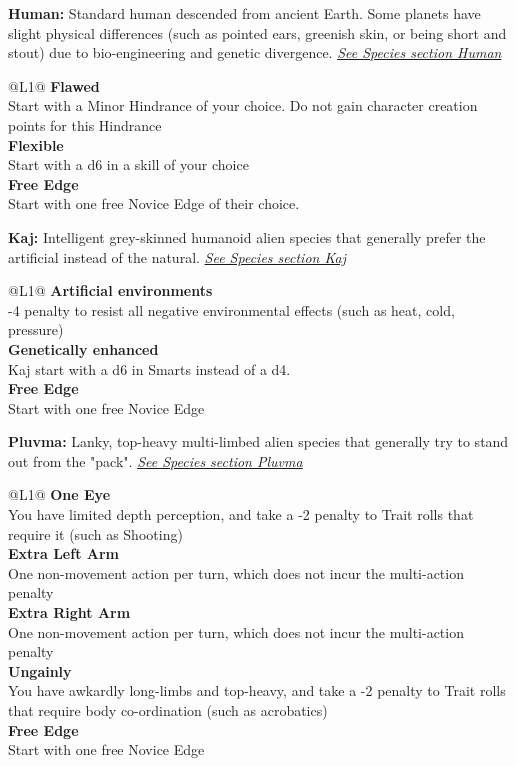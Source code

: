 \begin{enumerate}
  \textbf{Human:} Standard human descended from ancient Earth. Some planets have slight physical differences (such as pointed ears, greenish skin, or being short and stout) due to bio-engineering and genetic divergence. \textit{\hyperref[sec:specie-human]{See Species section Human}}
  \begin{redtable}{\linewidth}{@{}L{1}@{}}
    \textbf{Flawed}\\
    Start with a Minor Hindrance of your choice. Do not gain character creation points for this Hindrance\\
    \textbf{Flexible}\\
    Start with a d6 in a skill of your choice\\
    \textbf{Free Edge}\\
    Start with one free Novice Edge of their choice.\\
  \end{redtable}
  
  \hline
  
  \textbf{Kaj:} Intelligent grey-skinned humanoid alien species that generally prefer the artificial instead of the natural. \textit{\hyperref[sec:specie-kaj]{See Species section Kaj}}
  \begin{redtable}{\linewidth}{@{}L{1}@{}}
    \textbf{Artificial environments}\\
    -4 penalty to resist all negative environmental effects (such as heat, cold, pressure)\\
    \textbf{Genetically enhanced}\\
    Kaj start with a d6 in Smarts instead of a d4.\\
    \textbf{Free Edge}\\
    Start with one free Novice Edge\\
  \end{redtable}
  
  \hline
  
  \textbf{Pluvma:} Lanky, top-heavy multi-limbed alien species that generally try to stand out from the "pack". \textit{\hyperref[sec:specie-pluvma]{See Species section Pluvma}}
  \begin{redtable}{\linewidth}{@{}L{1}@{}}
    \textbf{One Eye}\\
    You have limited depth perception, and take a -2 penalty to Trait rolls that require it (such as Shooting)\\
    \textbf{Extra Left Arm}\\
    One non-movement action per turn, which does not incur the multi-action penalty\\
    \textbf{Extra Right Arm}\\
    One non-movement action per turn, which does not incur the multi-action penalty\\
    \textbf{Ungainly}\\
    You have awkardly long-limbs and top-heavy, and take a -2 penalty to Trait rolls that require body co-ordination (such as acrobatics)\\
    \textbf{Free Edge}\\
    Start with one free Novice Edge\\
  \end{redtable}
  

\end{enumerate}
